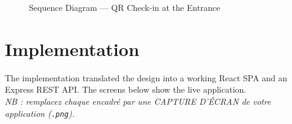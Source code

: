 \documentclass[12pt,a4paper]{report}
\begin{document}
\begin{figure}[H]
\centering
{}
\caption{Sequence Diagram --- QR Check-in at the Entrance}
\label{fig:seq-checkin}
\end{figure}

\section{Implementation}
The implementation translated the design into a working React SPA and an Express REST API.
The screens below show the live application.\\
\emph{NB : remplacez chaque encadr\'e par une CAPTURE D'\'ECRAN de votre application
(\texttt{.png}).}
\end{document}
